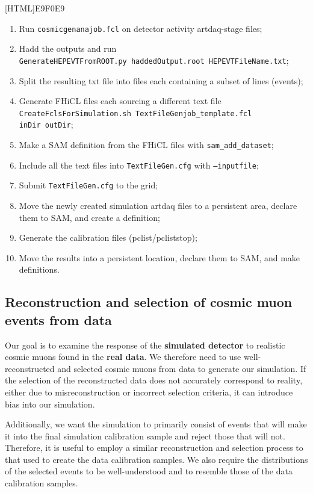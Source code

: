 \documentclass[12pt]{article}
\begin{document}
\vspace{5mm}
[HTML]{E9F0E9}{
\parbox{.9\textwidth}{
\begin{enumerate}
\item Run \texttt{cosmicgenanajob.fcl} on detector activity artdaq-stage files;
\item Hadd the outputs and run\\\texttt{GenerateHEPEVTFromROOT.py haddedOutput.root HEPEVTFileName.txt};
\item Split the resulting txt file into files each containing a subset of lines (events);
\item Generate FHiCL files each sourcing a different text file \\\texttt{CreateFclsForSimulation.sh TextFileGenjob\_template.fcl}\\ \hspace*{58mm}\texttt{inDir outDir};
\item Make a SAM definition from the FHiCL files with \texttt{sam\_add\_dataset};
\item Include all the text files into \texttt{TextFileGen.cfg} with \texttt{--inputfile};
\item Submit \texttt{TextFileGen.cfg} to the grid;
\item Move the newly created simulation artdaq files to a persistent area, declare them to SAM, and create a definition;
\item Generate the calibration files (pclist/pcliststop);
\item Move the results into a persistent location, declare them to SAM, and make definitions.
\end{enumerate}
}}

\subsection{Reconstruction and selection of cosmic muon events from data}\label{secCosmicGenAna}

Our goal is to examine the response of the \textbf{simulated detector} to realistic cosmic muons found in the \textbf{real data}. We therefore need to use well-reconstructed and selected cosmic muons from data to generate our simulation. If the selection of the reconstructed data does not accurately correspond to reality, either due to misreconstruction or incorrect selection criteria, it can introduce bias into our simulation.

Additionally, we want the simulation to primarily consist of events that will make it into the final simulation calibration sample and reject those that will not. Therefore, it is useful to employ a similar reconstruction and selection process to that used to create the data calibration samples. We also require the distributions of the selected events to be well-understood and to resemble those of the data calibration samples.
\end{document}
